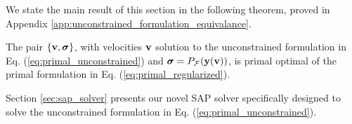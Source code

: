 We state the main result of this section in the following theorem, proved in
Appendix \ref{app:unconstrained_formulation_equivalance}.
\begin{theorem}
    The pair $\{{\mathbf{v}},{\bm\sigma}\}$, with velocities ${\mathbf{v}}$ solution to the
    unconstrained formulation in Eq. (\ref{eq:primal_unconstrained}) and
    ${\bm\sigma}=P_\mathcal{F}({\mathbf{y}}({\mathbf{v}}))$, is primal optimal of the primal
    formulation in Eq. (\ref{eq:primal_regularized}).
    \label{th:unconstrained_formulation_equivalance}
\end{theorem}

Section \ref{sec:sap_solver} presents our novel SAP solver specifically designed
to solve the unconstrained formulation in Eq. (\ref{eq:primal_unconstrained}).
